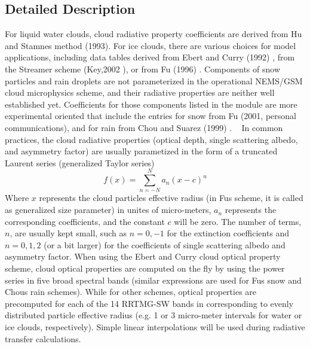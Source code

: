 \subsection{Detailed Description}
For liquid water clouds, cloud radiative property coefficients are derived from Hu and Stamnes method (1993)\cite{hu_and_stamnes_1993}. For ice clouds, there are various choices for model applications, including data tables derived from Ebert and Curry (1992) \cite{ebert_and_curry_1992}, from the Streamer scheme (Key,2002 \cite{key_2002}), or from Fu (1996) \cite{fu_1996} . Components of snow particles and rain droplets are not parameterized in the operational N\+E\+M\+S/\+G\+SM cloud microphysics scheme, and their radiative properties are neither well established yet. Coefficients for those components listed in the module are more experimental oriented that include the entries for snow from Fu (2001, personal communications), and for rain from Chou and Suarez (1999) \cite{chou_and_suarez_1999}. ~\newline
 In common practices, the cloud radiative properties (optical depth, single scattering albedo, and asymmetry factor) are usually parametized in the form of a truncated Laurent series (generalized Taylor series) \[ f(x)=\sum_{n=-N}^Na_{n}(x-c)^n \] Where $x$ represents the cloud particle\textquotesingle{}s effective radius (in Fu\textquotesingle{}s scheme, it is called as generalized size parameter) in unites of micro-\/meters, $a_{n}$ represents the corresponding coefficients, and the constant $c$ will be zero. The number of terms, $n$, are usually kept small, such as $n=0,-1$ for the extinction coefficients and $n=0,1,2$ (or a bit larger) for the coefficients of single scattering albedo and asymmetry factor. When using the Ebert and Curry cloud optical property scheme, cloud optical properties are computed \textquotesingle{}on the fly\textquotesingle{} by using the power series in five broad spectral bands (similar expressions are used for Fu\textquotesingle{}s snow and Chou\textquotesingle{}s rain schemes). While for other schemes, optical properties are precomputed for each of the 14 R\+R\+T\+M\+G-\/\+SW bands in corresponding to evenly distributed particle effective radius (e.\+g. 1 or 3 micro-\/meter intervals for water or ice clouds, respectively). Simple linear interpolations will be used during radiative transfer calculations. 